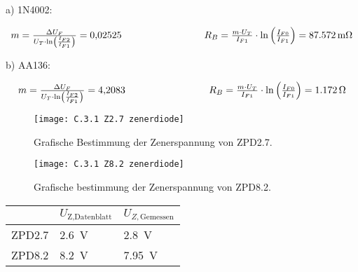 \documentclass[
	a4paper, %
	12pt, %
]{CSUniSchoolLabReport}
\newcommand{\milli}{m}
\begin{document}
a) 1N4002:

\begin{equation*}
\begin{array}{c@{\hspace{3cm}}c}
m = \frac{\Delta U_F}{U_T \cdot \ln\left( \frac{I_{F2}}{I_{F1}} \right)} = 0{,}02525
& R_B = \frac{m \cdot U_T}{I_{F1}} \cdot \ln\left(\frac{I_{F0}}{I_{F1}}\right) = \SI{87,572}{\milli\ohm}
\end{array}
\end{equation*}

b) AA136:

\begin{equation*}
\begin{array}{c@{\hspace{3cm}}c}
m = \frac{\Delta U_F}{U_T \cdot \ln\left( \frac{I_{F2}}{I_{F1}} \right)} = 4{,}2083
& R_B = \frac{m \cdot U_T}{I_{F1}} \cdot \ln\left(\frac{I_{F0}}{I_{F1}}\right) = \SI{1,172}{\ohm}
\end{array}
\end{equation*}

\begin{figure}[H] %
	\centering %
	\texttt{[image: C.3.1 Z2.7 zenerdiode]} %
	\caption{Grafische Bestimmung der Zenerspannung von ZPD2.7.}
\end{figure}

\vspace{3em}

\begin{figure}[H] %
	\centering %
	\texttt{[image: C.3.1 Z8.2 zenerdiode]} %
	\caption{Grafische bestimmung der Zenerspannung von ZPD8.2.}
\end{figure}

\begin{table}[H]
\centering
\begin{tabular}{l|ll}
                            & $U_{\text{Z,Datenblatt}}$ & $U_{Z,\text{Gemessen}}$ \\
\hline
ZPD2.7                      &\SI{2,6}{\volt}                        &\SI{2,8}{\volt}                      \\
\hline
ZPD8.2                      &\SI{8,2}{\volt}                        &\SI{7,95}{\volt}                      \\                       
\end{tabular}
\end{table}
\end{document}
